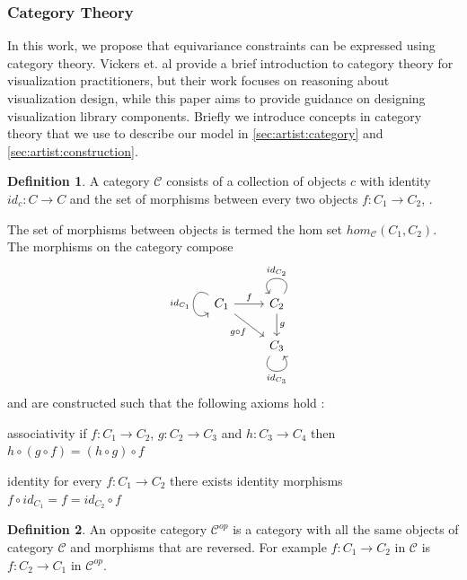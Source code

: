 \documentclass[10pt,journal,compsoc]{IEEEtran}
\theoremstyle{definition}
\newtheorem{definition}{Definition}[section]
\theoremstyle{remark}
\begin{document}
\subsubsection{Category Theory}
\label{sec:related-work:equivariance:category}
In this work, we propose that equivariance constraints can be expressed using category theory. Vickers et. al \cite{vickersUnderstandingVisualizationFormal2013} provide a brief introduction to category theory for visualization practitioners, but their work focuses on reasoning about visualization design, while this paper aims to provide guidance on designing visualization library components. Briefly we introduce concepts in category theory that we use to describe our model in \autoref{sec:artist:category} and \autoref{sec:artist:construction}. 

\begin{definition} A category $\mathcal{C}$ consists of a collection of objects $c$ with identity $id_c: C\rightarrow C$ and the set of morphisms between every two objects $f:C_1 \rightarrow C_2$, \cite{fongInvitationAppliedCategory2019,maclaneCategoriesWorkingMathematician2013}. 
\end{definition}
The set of morphisms between objects is termed the hom set $hom_{\mathcal{C}}(C_1, C_2)$. The morphisms on the category  compose
\begin{equation*}
  \begin{tikzcd}
    C_1 \arrow[r, "f"] \arrow[rd, "g\circ f"'] \arrow["id_{C_1}"', loop, distance=2em, in=215, out=145] & C_2 \arrow[d, "g"] \arrow["id_{C_2}"', loop, distance=2em, in=125, out=55] \\
  & C_3 \arrow["id_{C_3}"', loop, distance=2em, in=305, out=235]              
  \end{tikzcd}
\end{equation*}
 and are constructed such that the following axioms hold \cite{riehlCategoryTheoryContext}:
 \begin{LaTeXdescription}
   \item[associativity] if $f: C_1 \rightarrow C_2$, $g: C_2 \rightarrow C_3$ and $h: C_3 \rightarrow C_4$ then $h\circ (g \circ f) = (h \circ g) \circ f$
   \item[identity] for every $f: C_1 \rightarrow C_2$ there exists identity morphisms $f \circ id_{C_1} = f = id_{C_2} \circ f$
 \end{LaTeXdescription}

 \begin{definition} An opposite category $\mathcal{C}^{op}$ is a category with all the same objects of category $\mathcal{C}$ and morphisms that are reversed. For example $f:C_1 \rightarrow C_2$ in $\mathcal{C}$ is $f:C_2 \rightarrow C_1$ in $\mathcal{C}^{op}$.   
 \end{definition}
\end{document}
